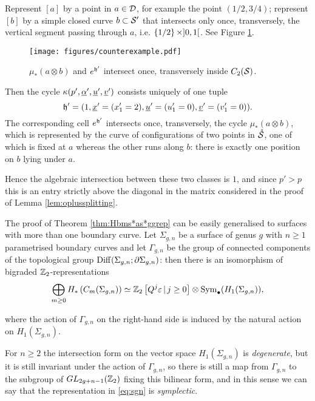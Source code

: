 Represent $[a]$ by a point in $a\in\D$, for example
the point $(1/2,3/4)$; represent $[b]$ by a simple closed curve $b\subset\S'$
that intersects only once, transversely, the vertical segment passing through $a$, i.e.
$\set{1/2}\times]0,1[$. See Figure \ref{fig:counterexample}.

\begin{figure}\centering
 \texttt{[image: figures/counterexample.pdf]}
 \caption{$\mu_*(a\otimes b)$ and $e^{\tup'}$ intersect once, transversely inside $C_2(\S)$.}
\label{fig:counterexample}
\end{figure}

Then the cycle $\kappa(p',\ualpha',\uu',\uv')$ consists uniquely of one tuple
\[
\tup'=(1,\ux'=(x'_1=2),\uu'=(u'_1=0),\uv'=(v'_1=0)).
\]
The corresponding cell $e^{\tup'}$ intersects once, transversely,
the cycle $\mu_*(a\otimes b)$, which is represented by the curve of configurations of two
points in $\mrS$, one of which is fixed at $a$ whereas the other runs along $b$:
there is exactly one position on $b$ lying under $a$.

Hence the algebraic intersection between these two classes is $1$, and since $p'>p$
this is an entry strictly above the diagonal in the matrix considered in the proof
of Lemma \ref{lem:oplussplitting}.

The proof of Theorem \ref{thm:Hbms*as*ggrep} can be easily generalised to surfaces
with more than one boundary curve. Let $\Sigma_{g,n}$ be a surface of genus
$g$ with $n\geq 1$ parametrised boundary curves and let $\Gamma_{g,n}$ be
the group of connected components of the topological group
$\Diff(\Sigma_{g,n};\partial\Sigma_{g,n})$:
then there is an isomorphism of bigraded $\Z_2$-representations
\begin{equation}
\label{eq:sgn}
\bigoplus_{m\geq 0}H_*\pa{C_m(\Sigma_{g,n})}\simeq \Z_2\left[Q^j\epsilon\,|\, j\geq 0\right]\otimes\Sym_{\bullet}(H_1(\Sigma_{g,n})),
\end{equation}

where the action of $\Gamma_{g,n}$ on the right-hand side is induced by the natural
action on $H_1(\Sigma_{g,n})$.

For $n\geq 2$ the intersection form on the vector space $H_1(\Sigma_{g,n})$
is \emph{degenerate}, but it is still invariant under the action of
$\Gamma_{g,n}$, so there is still a map from $\Gamma_{g,n}$ to the subgroup
of $GL_{2g+n-1}(\Z_2)$ fixing this bilinear form, and in this sense we can say
that the representation in \eqref{eq:sgn} is \emph{symplectic}.

